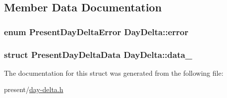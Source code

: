 \subsection{\-Member \-Data \-Documentation}
\hypertarget{structDayDelta_a240b38d4510157302ec42efc62ee498d}{
\subsubsection[{error}]{\setlength{\rightskip}{0pt plus 5cm}enum {\bf \-Present\-Day\-Delta\-Error} {\bf \-Day\-Delta\-::error}}}\label{structDayDelta_a240b38d4510157302ec42efc62ee498d}
\hypertarget{structDayDelta_af256f16b6700e43995186eea83db9ebc}{
\subsubsection[{data\-\_\-}]{\setlength{\rightskip}{0pt plus 5cm}struct \-Present\-Day\-Delta\-Data {\bf \-Day\-Delta\-::data\-\_\-}}}\label{structDayDelta_af256f16b6700e43995186eea83db9ebc}


\-The documentation for this struct was generated from the following file\-:\begin{DoxyCompactItemize}
\item 
present/\hyperlink{day-delta_8h}{day-\/delta.\-h}\end{DoxyCompactItemize}
